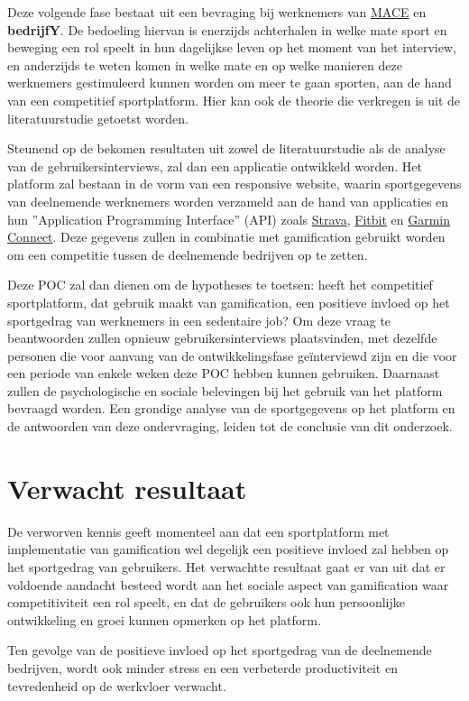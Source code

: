 Deze volgende fase bestaat uit een bevraging bij werknemers van \href{https://www.mace-legal.com/}{MACE} en \textbf{bedrijfY}. De bedoeling hiervan is enerzijds achterhalen in \linebreak welke mate sport en beweging een rol speelt in hun dagelijkse leven op het moment van het interview, en anderzijds te weten komen in welke mate en op welke manieren deze werknemers gestimuleerd kunnen worden om meer te gaan sporten, aan de hand van een competitief sportplatform. Hier kan ook de theorie die verkregen is uit de literatuurstudie getoetst worden.

Steunend op de bekomen resultaten uit zowel de literatuurstudie als de analyse van de gebruikersinterviews, zal dan een applicatie ontwikkeld worden. Het platform zal bestaan in de vorm van een responsive website, waarin sportgegevens van deelnemende werknemers worden verzameld aan de hand van applicaties en hun ''Application Programming Interface'' (API) zoals \linebreak \href{https://developers.strava.com/}{Strava}, \href{https://dev.fitbit.com/}{Fitbit} en \href{https://developer.garmin.com/gc-developer-program/overview/}{Garmin Connect}. Deze gegevens zullen in combinatie met gamification gebruikt worden om een competitie tussen de deelnemende bedrijven op te zetten.

Deze POC zal dan dienen om de hypotheses te toetsen: heeft het competitief sportplatform, dat gebruik maakt van gamification, een positieve invloed op het sportgedrag van werknemers in een sedentaire job? Om deze vraag te beantwoorden zullen opnieuw gebruikersinterviews plaatsvinden, met dezelfde personen die voor aanvang van de ontwikkelingsfase geïnterviewd zijn en die voor een periode van enkele weken deze POC hebben kunnen gebruiken. Daarnaast zullen de psychologische en sociale belevingen bij het gebruik van het platform bevraagd worden. Een grondige analyse van de sportgegevens op het platform en de antwoorden van deze ondervraging, leiden tot de conclusie van dit onderzoek.


\section{Verwacht resultaat}%
\label{sec:verwachte_resultaten}

De verworven kennis geeft momenteel aan dat een sportplatform met implementatie van gamification wel degelijk een positieve invloed zal hebben op het sportgedrag van gebruikers. Het verwachtte resultaat gaat er van uit dat er voldoende aandacht besteed wordt aan het sociale aspect van gamification waar competitiviteit een rol speelt, en dat de gebruikers ook hun persoonlijke ontwikkeling en groei kunnen opmerken op het platform.

Ten gevolge van de positieve invloed op het sportgedrag van de deelnemende bedrijven, \linebreak wordt ook minder stress en een verbeterde productiviteit en tevredenheid op de werkvloer verwacht.